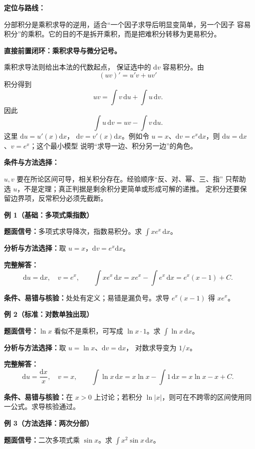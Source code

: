 \begin{knowledgeBox}
\textbf{定位与路线：}

分部积分是乘积求导的逆用，适合“一个因子求导后明显变简单，另一个因子
容易积分”的乘积。它的目的不是拆开乘积，而是把难积分转移为更易积分。

\textbf{直接前置闭环：乘积求导与微分记号。}

乘积求导法则给出本法的代数起点，
保证选中的
\(\mathrm dv\) 容易积分。由
\[
(uv)'=u'v+uv'
\]
积分得到
\[
uv=\int v\,\mathrm du+\int u\,\mathrm dv.
\]
因此
\[
\boxed{\int u\,\mathrm dv=uv-\int v\,\mathrm du.}
\]
这里 \(\mathrm du=u'(x)\mathrm dx\)，
\(\mathrm dv=v'(x)\mathrm dx\)。例如令 \(u=x\)、\(\mathrm dv=e^x
\mathrm dx\)，则 \(\mathrm du=\mathrm dx\)、\(v=e^x\)；这个最小模型
说明“求导一边、积分另一边”的角色。

\textbf{条件与方法选择：}

\(u,v\) 要在所论区间可导，相关积分存在。经验顺序“反、对、幂、三、指”
只帮助选 \(u\)，不是定理；真正判据是剩余积分更简单或形成可解的递推。
定积分还要保留边界项，反常积分必须先截断。

\textbf{例 1（基础：多项式乘指数）}

\textbf{题面信号：}多项式求导降次，指数易积分。求
\(\int xe^x\,\mathrm dx\)。

\textbf{分析与方法选择：}取 \(u=x\)，\(\mathrm dv=e^x\mathrm dx\)。

\textbf{完整解答：}
\[
\mathrm du=\mathrm dx,\quad v=e^x,\qquad
\int xe^x\,\mathrm dx=xe^x-\int e^x\,\mathrm dx
=e^x(x-1)+C.
\]

\textbf{条件、易错与核验：}处处有定义；易错是漏负号。求导
\(e^x(x-1)\) 得 \(xe^x\)。

\textbf{例 2（标准：对数单独出现）}

\textbf{题面信号：}\(\ln x\) 看似不是乘积，可写成
\(\ln x\cdot1\)。求 \(\int\ln x\,\mathrm dx\)。

\textbf{分析与方法选择：}取 \(u=\ln x\)、\(\mathrm dv=\mathrm dx\)，
对数求导变为 \(1/x\)。

\textbf{完整解答：}
\[
\mathrm du=\frac{\mathrm dx}{x},\quad v=x,\qquad
\int\ln x\,\mathrm dx=x\ln x-\int1\,\mathrm dx
=x\ln x-x+C.
\]

\textbf{条件、易错与核验：}在 \(x>0\) 上讨论；若积分
\(\ln|x|\)，则可在不跨零的区间使用同一公式。求导核验通过。

\textbf{例 3（方法选择：两次分部）}

\textbf{题面信号：}二次多项式乘 \(\sin x\)。求
\(\int x^2\sin x\,\mathrm dx\)。


\end{knowledgeBox}
